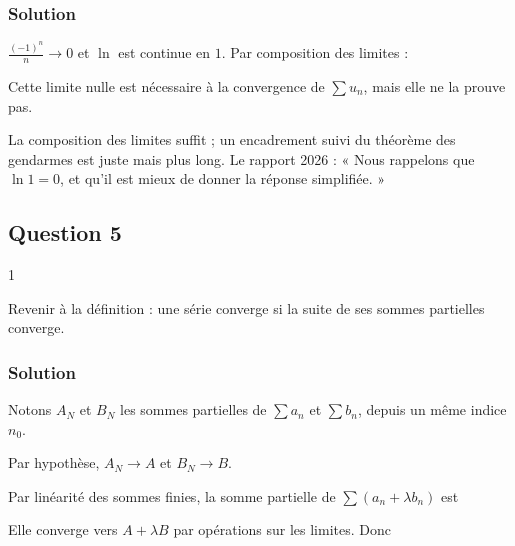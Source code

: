 \documentclass[11pt,a4paper]{article}
\newcommand{\equationajustee}[1]{%
  \sbox{\boiteequation}{$\displaystyle #1$}%
  \ifdim\wd\boiteequation>\linewidth
    \[\resizebox{\linewidth}{!}{\usebox{\boiteequation}}\]%
  \else
    \[#1\]%
  \fi}
\begin{document}
\hypertarget{solution-12}{%
\subsubsection{Solution}\label{solution-12}}

\(\frac{(-1)^n}{n}\to0\) et \(\ln\) est continue en \(1\). Par composition des limites :

\equationajustee{\boxed{\lim_{n\to+\infty}u_n=0}}

\begin{piege}

Cette limite nulle est nécessaire à la convergence de \(\sum u_n\), mais elle ne la prouve pas.

\end{piege}

\begin{jury}

La composition des limites suffit ; un encadrement suivi du théorème des gendarmes est juste mais plus long. Le rapport 2026 : « Nous rappelons que \(\ln 1 = 0\), et qu'il est mieux de donner la réponse simplifiée. »

\end{jury}

\hypertarget{question-5-1}{%
\subsection{Question 5}\label{question-5-1}}

\begin{indication}{1}

Revenir à la définition : une série converge si la suite de ses sommes partielles converge.

\end{indication}

\hypertarget{solution-13}{%
\subsubsection{Solution}\label{solution-13}}

Notons \(A_N\) et \(B_N\) les sommes partielles de \(\sum a_n\) et \(\sum b_n\), depuis un même indice \(n_0\).

Par hypothèse, \(A_N\to A\) et \(B_N\to B\).

Par linéarité des sommes finies, la somme partielle de \(\sum(a_n+\lambda b_n)\) est

\equationajustee{C_N=A_N+\lambda B_N.}

Elle converge vers \(A+\lambda B\) par opérations sur les limites. Donc
\end{document}
